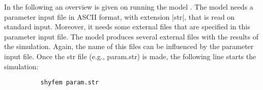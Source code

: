 
%
%
%
%
%
%
%

In the following an overview is given on running the model \shy{}. The
model needs a parameter input file in ASCII format, with extension |str|,
that is read on standard input. Moreover, it needs some external files
that are specified in this parameter input file. The model produces
several external files with the results of the simulation. Again, the
name of this files can be influenced by the parameter input file.
Once the str file (e.g., param.str) is made, the following line starts the simulation:

\begin{verbatim}
          shyfem param.str
\end{verbatim}



